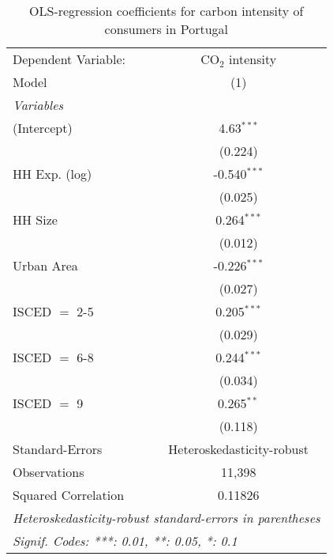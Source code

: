 
\begin{table}[htbp!]
   \centering
   \small
   \begin{adjustbox}{width = 1\textwidth, max height = 0.95\textheight, center}
      \begin{threeparttable}[b]
         \caption{\label{tab:OLS_1_PRT} OLS-regression coefficients for carbon intensity of consumers in Portugal}
         \begin{tabular}{lc}
            \tabularnewline \midrule \midrule
            Dependent Variable: & CO$_{2}$ intensity\\  
            Model               & (1)\\  
            \midrule
            \emph{Variables}\\
            (Intercept)         & 4.63$^{***}$\\   
                                & (0.224)\\   
            HH Exp. (log)       & -0.540$^{***}$\\   
                                & (0.025)\\   
            HH Size             & 0.264$^{***}$\\   
                                & (0.012)\\   
            Urban Area          & -0.226$^{***}$\\   
                                & (0.027)\\   
            ISCED $=$ 2-5       & 0.205$^{***}$\\   
                                & (0.029)\\   
            ISCED $=$ 6-8       & 0.244$^{***}$\\   
                                & (0.034)\\   
            ISCED $=$ 9         & 0.265$^{**}$\\   
                                & (0.118)\\   
            \midrule 
            Standard-Errors     & Heteroskedasticity-robust \\   
            Observations        & 11,398\\  
            Squared Correlation & 0.11826\\  
            \midrule \midrule
            \multicolumn{2}{l}{\emph{Heteroskedasticity-robust standard-errors in parentheses}}\\
            \multicolumn{2}{l}{\emph{Signif. Codes: ***: 0.01, **: 0.05, *: 0.1}}\\
         \end{tabular}
         

\end{threeparttable}
\end{adjustbox}
\end{table}
